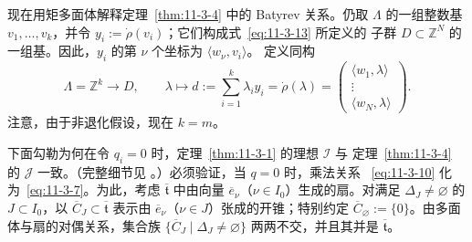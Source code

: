 现在用矩多面体解释定理~\ref{thm:11-3-4} 中的 Batyrev 关系。仍取 $\Lambda$ 的一组整数基
$v_1,\ldots,v_k$，并令 $y_i:=\dot\rho(v_i)$；它们构成式~\eqref{eq:11-3-13} 所定义的
子群 $D\subset\mathbb Z^N$ 的一组基。因此，$y_i$ 的第 $\nu$ 个坐标为
$\langle w_\nu,v_i\rangle$。
定义同构
\begin{equation}\label{eq:11-3-14}
  \Lambda=\mathbb Z^k\longrightarrow D,
  \qquad
  \lambda\longmapsto d:=\sum_{i=1}^k\lambda_i y_i
  =\dot\rho(\lambda)
  =\begin{pmatrix}
    \langle w_1,\lambda\rangle\\[-1mm]
    \vdots\\[-1mm]
    \langle w_N,\lambda\rangle
  \end{pmatrix}.
\end{equation}
注意，由于非退化假设，现在 $k=m$。

下面勾勒为何在令 $q_i=0$ 时，定理~\ref{thm:11-3-1} 的理想 $\mathcal I$ 与
定理~\ref{thm:11-3-4} 的 $\mathcal J$ 一致。（完整细节见
。）必须验证，当 $q=0$ 时，乘法关系
~\eqref{eq:11-3-10} 化为~\eqref{eq:11-3-7}。为此，考虑
$\overline{\mathfrak t}$ 中由向量 $\overline e_\nu$（$\nu\in I_0$）生成的扇。对满足
$\Delta_J\ne\varnothing$ 的 $J\subset I_0$，以
$\overline C_J\subset\overline{\mathfrak t}$ 表示由
$\overline e_\nu$（$\nu\in J$）张成的开锥；特别约定
$\overline C_\varnothing:=\{0\}$。由多面体与扇的对偶关系，集合族
$\{\overline C_J\mid\Delta_J\ne\varnothing\}$ 两两不交，并且其并是
$\overline{\mathfrak t}$。

